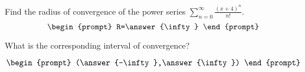 \documentclass{ximera}
\author{Gregory Hartman \and Matthew Carr}
\begin{document}
\begin{exercise}




Find the radius of convergence of the power series $\sum_{n=0}^{\infty}\frac{(x+4)^{n}}{n!}$.
\[
\begin{prompt}
R=\answer{\infty}
\end{prompt}
\]

What is the corresponding interval of convergence?

\[
\begin{prompt}
(\answer{-\infty},\answer{\infty})
\end{prompt}
\]

\end{exercise}
\end{document}
